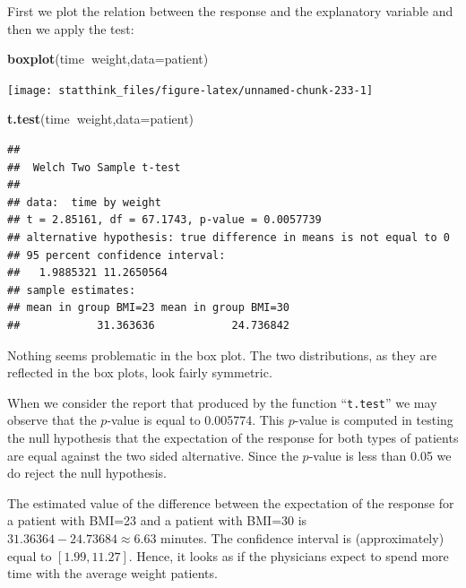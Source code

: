 \documentclass[]{krantz}
\makeatletter
\newenvironment{Shaded}{\begin{snugshade}}{\end{snugshade}}
\newcommand{\KeywordTok}[1]{\textcolor[rgb]{0.13,0.29,0.53}{\textbf{#1}}}
\newcommand{\DataTypeTok}[1]{\textcolor[rgb]{0.13,0.29,0.53}{#1}}
\newcommand{\OperatorTok}[1]{\textcolor[rgb]{0.81,0.36,0.00}{\textbf{#1}}}
\newcommand{\NormalTok}[1]{#1}
\newenvironment{kframe}{%
\medskip{}
\setlength{\fboxsep}{.8em}
 \def\at@end@of@kframe{}%
 \ifinner\ifhmode%
  \def\at@end@of@kframe{\end{minipage}}%
  \begin{minipage}{\columnwidth}%
 \fi\fi%
 \def\FrameCommand##1{\hskip\@totalleftmargin \hskip-\fboxsep
 \colorbox{shadecolor}{##1}\hskip-\fboxsep
     \hskip-\linewidth \hskip-\@totalleftmargin \hskip\columnwidth}%
 \MakeFramed {\advance\hsize-\width
   \@totalleftmargin\z@ \linewidth\hsize
   \@setminipage}}%
 {\par\unskip\endMakeFramed%
 \at@end@of@kframe}
\renewenvironment{Shaded}{\begin{kframe}}{\end{kframe}}
\theoremstyle{definition}
\theoremstyle{definition}
\theoremstyle{definition}
\theoremstyle{remark}
\makeatother
\begin{document}
First we plot the relation between the response and the explanatory
variable and then we apply the test:

\begin{Shaded}
\begin{Highlighting}[]
\KeywordTok{boxplot}\NormalTok{(time}\OperatorTok{~}\NormalTok{weight,}\DataTypeTok{data=}\NormalTok{patient)}
\end{Highlighting}
\end{Shaded}

\begin{center}\texttt{[image: statthink\_files/figure-latex/unnamed-chunk-233-1]} \end{center}

\begin{Shaded}
\begin{Highlighting}[]
\KeywordTok{t.test}\NormalTok{(time}\OperatorTok{~}\NormalTok{weight,}\DataTypeTok{data=}\NormalTok{patient)}
\end{Highlighting}
\end{Shaded}

\begin{verbatim}
## 
##  Welch Two Sample t-test
## 
## data:  time by weight
## t = 2.85161, df = 67.1743, p-value = 0.0057739
## alternative hypothesis: true difference in means is not equal to 0
## 95 percent confidence interval:
##   1.9885321 11.2650564
## sample estimates:
## mean in group BMI=23 mean in group BMI=30 
##            31.363636            24.736842
\end{verbatim}

Nothing seems problematic in the box plot. The two distributions, as
they are reflected in the box plots, look fairly symmetric.

When we consider the report that produced by the function
``\texttt{t.test}'' we may observe that the \(p\)-value is equal to
0.005774. This \(p\)-value is computed in testing the null hypothesis
that the expectation of the response for both types of patients are
equal against the two sided alternative. Since the \(p\)-value is less
than 0.05 we do reject the null hypothesis.

The estimated value of the difference between the expectation of the
response for a patient with BMI=23 and a patient with BMI=30 is
\(31.36364 -24.73684 \approx 6.63\) minutes. The confidence interval is
(approximately) equal to \([1.99, 11.27]\). Hence, it looks as if the
physicians expect to spend more time with the average weight patients.
\end{document}
